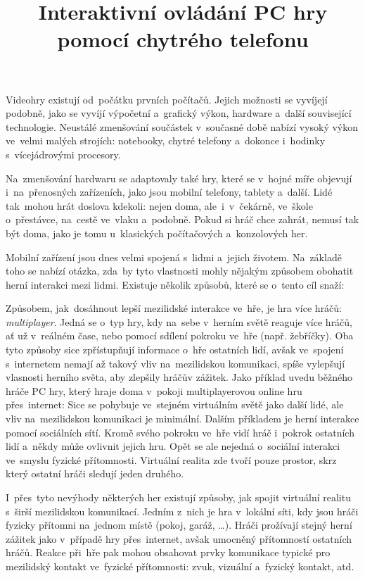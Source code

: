 \documentclass[thesis=B,czech,hidelinks]{FITthesis}[2012/06/26] %
\title{Interaktivn{\' i} ovl{\' a}d{\' a}n{\' i} PC hry pomoc{\' i} chytr{\' e}ho telefonu}
\begin{document}
 

\begin{introduction}
Videohry existují od~počátku prvních počítačů. \cite{rylich} Jejich možnosti se vyvíjejí podobně, jako se vyvíjí výpočetní a~grafický výkon, hardware a~další související technologie. Neustálé zmenšování součástek v~současné době nabízí vysoký výkon ve~velmi malých strojích: notebooky, chytré telefony a~dokonce i~hodinky s~vícejádrovými procesory. \cite{kupi}

Na~zmenšování hardwaru se adaptovaly také hry, které se v~hojné míře objevují i~na~přenosných zařízeních, jako jsou mobilní telefony, tablety a~další. Lidé tak~mohou hrát doslova kdekoli: nejen doma, ale~i~v~čekárně, ve~škole o~přestávce, na~cestě ve~vlaku a~podobně. Pokud si hráč chce zahrát, nemusí tak být doma, jako je tomu u~klasických počítačových a~konzolových her.

Mobilní zařízení jsou dnes velmi spojená s~lidmi a~jejich životem. Na~základě toho se nabízí otázka, zda~by tyto vlastnosti mohly nějakým způsobem obohatit herní interakci mezi lidmi. Existuje několik způsobů, které se o~tento cíl snaží:

Způsobem, jak~dosáhnout lepší mezilidské interakce ve~hře, je hra více hráčů: \textit{multiplayer}. Jedná se o~typ hry, kdy na~sebe v~herním světě reaguje více hráčů, ať už v~reálném čase, nebo pomocí sdílení pokroku ve~hře (např. žebříčky). Oba tyto způsoby sice zpřístupňují informace o~hře ostatních lidí, avšak ve~spojení s~internetem nemají až takový vliv na~mezilidskou komunikaci, spíše vylepšují vlasnosti herního světa, aby zlepšily hráčův zážitek. Jako příklad uvedu běžného hráče PC hry, který hraje doma v~pokoji multiplayerovou online hru přes~internet: Sice se pohybuje ve~stejném virtuálním světě jako další lidé, ale vliv na~mezilidskou komunikaci je minimální. Dalším příkladem je herní interakce pomocí sociálních sítí. Kromě svého pokroku ve~hře vidí hráč i~pokrok ostatních lidí a~někdy může ovlivnit jejich hru. Opět se ale nejedná o~sociální interakci ve~smyslu fyzické přítomnosti. Virtuální realita zde tvoří pouze prostor, skrz který ostatní hráči sledují jeden druhého.

I~přes~tyto nevýhody některých her existují způsoby, jak spojit virtuální realitu s~širší mezilidskou komunikací. Jedním z~nich je hra v~lokální síti, kdy jsou hráči fyzicky přítomni na~jednom místě (pokoj, garáž, …). Hráči prožívají stejný herní zážitek jako v~případě hry přes~internet, avšak umocněný přítomností ostatních hráčů. Reakce při~hře pak mohou obsahovat prvky komunikace typické pro mezilidský kontakt ve~fyzické přítomnosti: zvuk, vizuální a~fyzický kontakt, atd.


\end{introduction}
\end{document}
